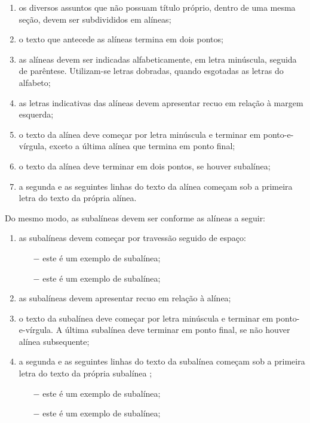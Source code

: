 \documentclass[
        oneside,      %
        english,			
        brazil			 
        ]{configcefetmglpd}
\begin{document}
\begin{enumerate}[label=\alph*)]
	\item os diversos assuntos que não possuam título próprio, dentro de uma mesma seção, devem ser subdivididos em alíneas; 
	\item o texto que antecede as alíneas termina em dois pontos; 
	\item as alíneas devem ser indicadas alfabeticamente, em letra minúscula, seguida de parêntese. Utilizam-se letras dobradas, quando esgotadas as letras do alfabeto;
	\item as letras indicativas das alíneas devem apresentar recuo em relação à margem esquerda;
	\item o texto da alínea deve começar por letra minúscula e terminar em ponto-e-vírgula, exceto a última alínea que termina em ponto final;
	\item o texto da alínea deve terminar em dois pontos, se houver subalínea;
	\item a segunda e as seguintes linhas do texto da alínea começam sob a primeira letra do texto da própria alínea.
\end{enumerate}

Do mesmo modo, as subalíneas devem ser conforme as alíneas a seguir:

\begin{enumerate}[label=\alph*)]
	\item as subalíneas devem começar por travessão seguido de espaço:
	\begin{itemize}
		\item[$-$] este é um exemplo de subalínea;
		\item[$-$] este é um exemplo de subalínea;
	\end{itemize}
	\item as subalíneas devem apresentar recuo em relação à alínea;
	\item o texto da subalínea deve começar por letra minúscula e terminar em ponto-e-vírgula. A última subalínea deve terminar em ponto final, se não houver alínea subsequente;
	\item a segunda e as seguintes linhas do texto da subalínea começam sob a primeira letra do texto da própria subalínea \cite{bib:abnt6024};
	\begin{itemize}
		\item[$-$] este é um exemplo de subalínea;
		\item[$-$] este é um exemplo de subalínea;
	\end{itemize}
\end{enumerate}
\end{document}
